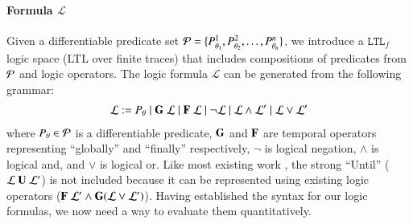 \paragraph{Formula $\mathcal{L}$}
Given a differentiable predicate set $\mathcal{P} = \{P^{1}_{\theta_1}, P^{2}_{\theta_2}, \ldots, P^{n}_{\theta_n}\}$, we introduce a $\mathtt{LTL}_f$ logic space \cite{LTLf} (LTL over finite traces) that includes compositions of predicates from $\mathcal{P}$ and logic operators. The logic formula  $\mathcal{L}$ can be generated from the following grammar:
\begin{align}
    \mathcal{L} := P_{\theta} \mid \mathbf{G}\ \mathcal{L} \mid \mathbf{F}\ \mathcal{L} \mid \lnot \mathcal{L} \mid \mathcal{L} \land \mathcal{L}' \mid \mathcal{L} \lor \mathcal{L}'
\end{align}
\label{eq:logic_formula_syntax}
where $P_{\theta} \in \mathcal{P}$ is a differentiable predicate, $\mathbf{G}$ and $\mathbf{F}$ are temporal operators representing ``globally'' and ``finally'' respectively, $\lnot$ is logical negation, $\land$ is logical and, and $\lor$ is logical or.  Like most existing work \cite{bartocci2022survey}, the strong ``Until'' ($\mathcal{L}\ \mathbf{U}\ \mathcal{L}'$) is not included because it can be represented using existing logic operators ($\mathbf{F}\ \mathcal{L}' \wedge \mathbf{G}(\mathcal{L} \lor \mathcal{L}')$). Having established the syntax for our logic formulas, we now need a way to evaluate them quantitatively.


